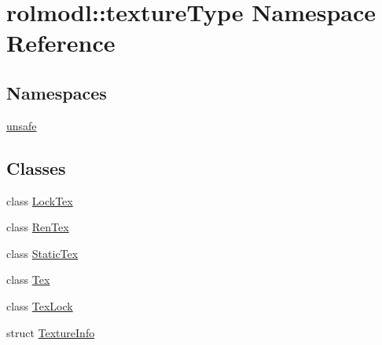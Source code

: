 \hypertarget{namespacerolmodl_1_1texture_type}{}\section{rolmodl\+::texture\+Type Namespace Reference}
\label{namespacerolmodl_1_1texture_type}
\subsection*{Namespaces}
\begin{DoxyCompactItemize}
\item 
 \mbox{\hyperlink{namespacerolmodl_1_1texture_type_1_1unsafe}{unsafe}}
\end{DoxyCompactItemize}
\subsection*{Classes}
\begin{DoxyCompactItemize}
\item 
class \mbox{\hyperlink{classrolmodl_1_1texture_type_1_1_lock_tex}{Lock\+Tex}}
\item 
class \mbox{\hyperlink{classrolmodl_1_1texture_type_1_1_ren_tex}{Ren\+Tex}}
\item 
class \mbox{\hyperlink{classrolmodl_1_1texture_type_1_1_static_tex}{Static\+Tex}}
\item 
class \mbox{\hyperlink{classrolmodl_1_1texture_type_1_1_tex}{Tex}}
\item 
class \mbox{\hyperlink{classrolmodl_1_1texture_type_1_1_tex_lock}{Tex\+Lock}}
\item 
struct \mbox{\hyperlink{structrolmodl_1_1texture_type_1_1_texture_info}{Texture\+Info}}
\end{DoxyCompactItemize}
